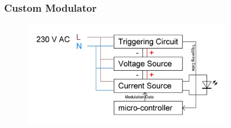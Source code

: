\documentclass{beamer}
\begin{document}



	\begin{frame}\frametitle{Custom Modulator}
		\begin{figure}
			\centering
			\includegraphics[width=0.8\textwidth]{ac-modulator-architectural.JPG}
		\end{figure}
	\end{frame}








\end{document}
